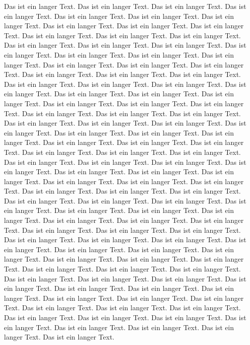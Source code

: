 \documentclass[twoside]{article}
\begin{document}
Das ist ein langer Text. Das ist ein langer Text.
Das ist ein langer Text. Das ist ein langer Text.
Das ist ein langer Text. Das ist ein langer Text.
Das ist ein langer Text. Das ist ein langer Text.
Das ist ein langer Text. Das ist ein langer Text.
Das ist ein langer Text. Das ist ein langer Text.
Das ist ein langer Text. Das ist ein langer Text.
Das ist ein langer Text. Das ist ein langer Text.
Das ist ein langer Text. Das ist ein langer Text.
Das ist ein langer Text. Das ist ein langer Text.
Das ist ein langer Text. Das ist ein langer Text.
Das ist ein langer Text. Das ist ein langer Text.
Das ist ein langer Text. Das ist ein langer Text.
Das ist ein langer Text. Das ist ein langer Text.
Das ist ein langer Text. Das ist ein langer Text.
Das ist ein langer Text. Das ist ein langer Text.
Das ist ein langer Text. Das ist ein langer Text.
Das ist ein langer Text. Das ist ein langer Text.
Das ist ein langer Text. Das ist ein langer Text.
Das ist ein langer Text. Das ist ein langer Text.
Das ist ein langer Text. Das ist ein langer Text.
Das ist ein langer Text. Das ist ein langer Text.
Das ist ein langer Text. Das ist ein langer Text.
Das ist ein langer Text. Das ist ein langer Text.
Das ist ein langer Text. Das ist ein langer Text.
Das ist ein langer Text. Das ist ein langer Text.
Das ist ein langer Text. Das ist ein langer Text.
Das ist ein langer Text. Das ist ein langer Text.
Das ist ein langer Text. Das ist ein langer Text.
Das ist ein langer Text. Das ist ein langer Text.
Das ist ein langer Text. Das ist ein langer Text.
Das ist ein langer Text. Das ist ein langer Text.
Das ist ein langer Text. Das ist ein langer Text.
Das ist ein langer Text. Das ist ein langer Text.
Das ist ein langer Text. Das ist ein langer Text.
Das ist ein langer Text. Das ist ein langer Text.
Das ist ein langer Text. Das ist ein langer Text.
Das ist ein langer Text. Das ist ein langer Text.
Das ist ein langer Text. Das ist ein langer Text.
Das ist ein langer Text. Das ist ein langer Text.
Das ist ein langer Text. Das ist ein langer Text.
Das ist ein langer Text. Das ist ein langer Text.
Das ist ein langer Text. Das ist ein langer Text.
Das ist ein langer Text. Das ist ein langer Text.
Das ist ein langer Text. Das ist ein langer Text.
Das ist ein langer Text. Das ist ein langer Text.
Das ist ein langer Text. Das ist ein langer Text.
Das ist ein langer Text. Das ist ein langer Text.
Das ist ein langer Text. Das ist ein langer Text.
Das ist ein langer Text. Das ist ein langer Text.
Das ist ein langer Text. Das ist ein langer Text.
Das ist ein langer Text. Das ist ein langer Text.
Das ist ein langer Text. Das ist ein langer Text.
Das ist ein langer Text. Das ist ein langer Text.
Das ist ein langer Text. Das ist ein langer Text.
Das ist ein langer Text. Das ist ein langer Text.
\end{document}

